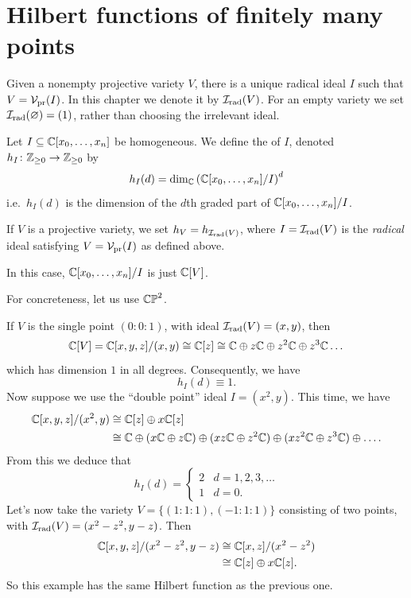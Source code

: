 \section{Hilbert functions of finitely many points}
\begin{definition}
	Given a nonempty projective variety $V$, there is a unique
	radical ideal $I$ such that $V = \mathcal V_{\text{pr}}(I)$.
	In this chapter we denote it by $\mathcal I_{\text{rad}}(V)$.
	For an empty variety we set $\mathcal I_{\text{rad}}(\varnothing) = (1)$,
	rather than choosing the irrelevant ideal.
\end{definition}
\begin{definition}
	Let $I \subseteq \mathbb C[x_0, \dots, x_n]$ be homogeneous.
	We define the  of $I$,
	denoted $h_I \colon \mathbb Z_{\ge 0} \to \mathbb Z_{\ge 0}$ by
	\[ h_I(d) = \dim_{\mathbb C} \left( \mathbb C[x_0, \dots, x_n]/I \right)^d \]
	i.e.\ $h_I(d)$ is the dimension of the $d$th graded part of
	$\mathbb C[x_0, \dots, x_n] / I$.
\end{definition}
\begin{definition}
	If $V$ is a projective variety, we set $h_V = h_{\mathcal I_{\text{rad}}(V)}$,
	where $I=\mathcal I_{\text{rad}}(V)$ is the \emph{radical} ideal satisfying
	$V = \mathcal V_{\text{pr}}(I)$ as defined above.
\end{definition}
In this case, $\mathbb C[x_0, \dots, x_n]/I$ is just $\mathbb C[V]$.
\begin{example}
	\label{ex:hilbert_zero}
	For concreteness, let us use $\mathbb{CP}^2$.
	\begin{enumerate}[(a)]
		\ii If $V$ is the single point $(0:0:1)$,
		with ideal $\mathcal I_{\text{rad}}(V) = (x,y)$,
		then
		\[ \mathbb C[V] = \mathbb C[x,y,z] / (x,y) \cong \mathbb C[z]
		\cong \mathbb C \oplus z\mathbb C \oplus z^2\mathbb C \oplus z^3\mathbb C \dots \]
		which has dimension $1$ in all degrees.
		Consequently, we have \[ h_I(d) \equiv 1. \]
		\ii Now suppose we use the ``double point'' ideal $I = (x^2,y)$.
		This time, we have
		\begin{align*}
			\mathbb C[x,y,z] / (x^2,y)
			&\cong \mathbb C[z] \oplus x\mathbb C[z] \\
			&\cong \mathbb C \oplus (x\mathbb C \oplus z\mathbb C) \oplus (xz\mathbb C \oplus z^2\mathbb C)
			\oplus (xz^2\mathbb C \oplus z^3\mathbb C) \oplus\dots.
		\end{align*}
		From this we deduce that
		\[
			h_I(d) =
			\begin{cases}
				2 & d = 1, 2, 3, \dots \\
				1 & d = 0.
			\end{cases}
		\]
		\ii Let's now take the variety $V = \{(1:1:1), (-1:1:1)\}$
		consisting of two points, with $\mathcal I_{\text{rad}}(V) = (x^2-z^2, y-z)$. Then
		\begin{align*}
			\mathbb C[x,y,z] / (x^2-z^2,y-z)
			&\cong \mathbb C[x,z] / (x^2-z^2) \\
			&\cong \mathbb C[z] \oplus x\mathbb C[z].
		\end{align*}
		So this example has the same Hilbert function as the previous one.
	\end{enumerate}
\end{example}
